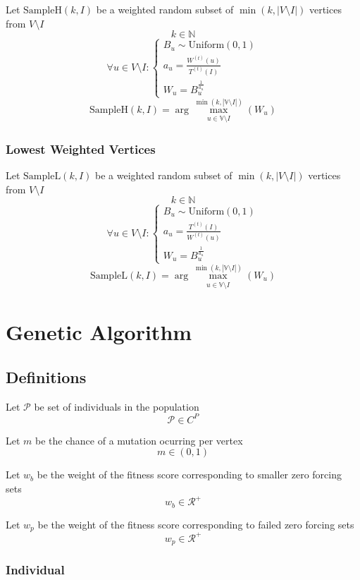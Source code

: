 \documentclass[11pt]{article}
\begin{document}
Let $\text{SampleH}(k, I)$ be a weighted random subset of $\min(k, |V \setminus I|)$ vertices from $V \setminus I$ 
$$k \in \mathbb{N}$$
$$\forall u \in V \setminus I: \begin{cases}
    B_u \sim \text{Uniform}(0, 1) \\ 
    a_u = \frac{W^{(t)}(u)}{T^{(t)}(I)} \\ 
    W_u = B_u^{\frac{1}{a_u}}
\end{cases}$$
$$\text{SampleH}(k, I) = \arg \overset{\min(k, |\mathbb{V} \setminus I|)}{\max_{\substack{u \in \mathbb{V} \setminus I}}}(W_u)$$

\subsubsection{Lowest Weighted Vertices}

Let $\text{SampleL}(k, I)$ be a weighted random subset of $\min(k, |V \setminus I|)$ vertices from $V \setminus I$ 
$$k \in \mathbb{N}$$
$$\forall u \in V \setminus I: \begin{cases}
    B_u \sim \text{Uniform}(0, 1) \\ 
    a_u = \frac{T^{(t)}(I)}{W^{(t)}(u)} \\ 
    W_u = B_u^{\frac{1}{a_u}}
\end{cases}$$
$$\text{SampleL}(k, I) = \arg \overset{\min(k, |\mathbb{V} \setminus I|)}{\max_{\substack{u \in \mathbb{V} \setminus I}}}(W_u)$$

\section{Genetic Algorithm}

\subsection{Definitions}

Let $\mathcal{P}$ be set of individuals in the population
$$\mathcal{P} \in C^{P}$$

Let $m$ be the chance of a mutation ocurring per vertex
$$m \in (0, 1)$$

Let $w_b$ be the weight of the fitness score corresponding to smaller zero forcing sets
$$w_b \in \mathcal{R}^+$$

Let $w_p$ be the weight of the fitness score corresponding to failed zero forcing sets
$$w_p \in \mathcal{R}^+$$

\subsubsection{Individual}
\end{document}
